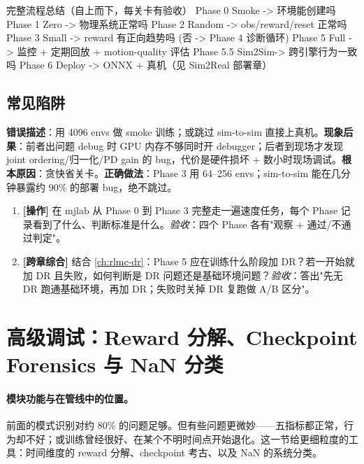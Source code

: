 \begin{codebox}[text]{完整流程总结（自上而下，每关卡有验收）}
Phase 0 Smoke    -> 环境能创建吗
Phase 1 Zero     -> 物理系统正常吗
Phase 2 Random   -> obs/reward/reset 正常吗
Phase 3 Small    -> reward 有正向趋势吗  (否 -> Phase 4 诊断循环)
Phase 5 Full     -> 监控 + 定期回放 + motion-quality 评估
Phase 5.5 Sim2Sim-> 跨引擎行为一致吗
Phase 6 Deploy   -> ONNX + 真机（见 Sim2Real 部署章）
\end{codebox}

\subsection{常见陷阱}

\begin{pitfall}
\textbf{错误描述}：用 4096 envs 做 smoke 训练；或跳过 sim-to-sim 直接上真机。\textbf{现象后果}：前者出问题 debug 时 GPU 内存不够同时开 debugger；后者到现场才发现 joint ordering/归一化/PD gain 的 bug，代价是硬件损坏 + 数小时现场调试。\textbf{根本原因}：贪快省关卡。\textbf{正确做法}：Phase 3 用 64--256 envs；sim-to-sim 能在几分钟暴露约 90\% 的部署 bug，绝不跳过。
\end{pitfall}

\begin{practice}[本节动手任务]
\begin{enumerate}
  \item \textbf{[操作]} 在 mjlab 从 Phase 0 到 Phase 3 完整走一遍速度任务，每个 Phase 记录看到了什么、判断标准是什么。\emph{验收}：四个 Phase 各有"观察 + 通过/不通过判定"。
  \item \textbf{[跨章综合]} 结合 \cref{ch:rlmc-dr}：Phase 5 应在训练什么阶段加 DR？若一开始就加 DR 且失败，如何判断是 DR 问题还是基础环境问题？\emph{验收}：答出"先无 DR 跑通基础环境，再加 DR；失败时关掉 DR 复跑做 A/B 区分"。
\end{enumerate}
\end{practice}

\section{高级调试：Reward 分解、Checkpoint Forensics 与 NaN 分类}
\label{sec:rlmc-diag-advanced}

\paragraph{模块功能与在管线中的位置。}前面的模式识别对约 80\% 的问题足够。但有些问题更微妙——五指标都正常，行为却不好；或训练曾经很好、在某个不明时间点开始退化。这一节给更细粒度的工具：时间维度的 reward 分解、checkpoint 考古、以及 NaN 的系统分类。

